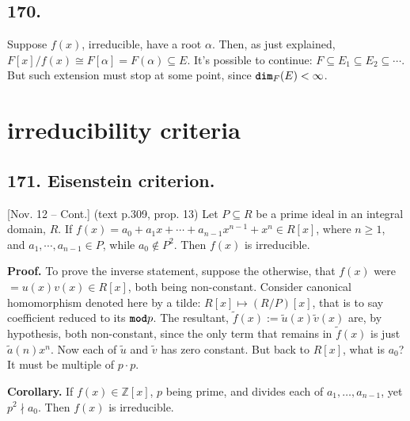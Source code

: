 \documentclass[12pt]{article}
\newcommand\aG\alpha \newcommand\bG\beta  \newcommand\gG\gamma \newcommand\dG\delta \newcommand\eG\varepsilon \newcommand\zG\zeta \newcommand\tG\vartheta \newcommand\kG\kappa \newcommand\lG\lambda \newcommand\sG\sigma \newcommand\fG\varphi \newcommand\oG\omega
\newcommand\oo\infty%
\newcommand\M\cdot%
\newcommand\Mp\mapsto%
\newcommand{\BF}[1]{ \mathbb{#1} }%
\newcommand{\Ss}[1]{\textsf{\bfseries{#1}}}%
\newcommand{\Tw}[1]{\texttt{\bfseries{#1}}}%
\begin{document}
\subsection*{170.} Suppose \(f(x)\), irreducible, have a root \(\aG\). 
Then, as just explained, \(F[x]/f(x) \cong F[\aG] = F(\aG) \subseteq E\). 
It's possible to continue: \(F \subseteq E_1 \subseteq E_2 \subseteq \dotsb\). 
But such extension must stop at some point, since \(\Tw{dim}_{F}(E) <\oo\). 

\section{irreducibility criteria}
\subsection*{171. Eisenstein criterion.} [Nov. 12 -- Cont.] (text p.309, prop. 13) Let \(P \subseteq R\) be a prime ideal in an integral domain, \(R\). 
If \(f(x) = a_0 +a_1x +\dotsb+ a_{n-1}x^{n-1} + x^n \in R[x]\), where \(n \geq 1\), and \(a_1,\dotsb,a_{n-1} \in P\), while \(a_0 \notin P^2\). 
Then \(f(x)\) is irreducible. \par
\Ss{Proof.} To prove the inverse statement, suppose the otherwise, that \(f(x)\) were \(= u(x) v(x) \in R[x]\), both being non-constant. 
Consider canonical homomorphism denoted here by a tilde: \(R[x] \Mp (R/P)[x]\), that is to say coefficient reduced to its \(\Tw{mod} p\). 
The resultant, \(\tilde{f}(x) := \tilde{u}(x) \tilde{v}(x)\) are, by hypothesis, both non-constant, since the only term that remains in \(\tilde{f}(x)\) is just \(\tilde{a}(n) x^n\). 
Now each of \(\tilde{u}\) and \(\tilde{v}\) has zero constant. 
But back to \(R[x]\), what is \(a_0\)? It must be multiple of \(p \M p\). \par
\Ss{Corollary.} If \(f(x) \in \BF{Z}[x]\), \(p\) being prime, and divides each of \(a_1,\dotsc,a_{n-1}\), yet \(p^2 \nmid a_0\). 
Then \(f(x)\) is irreducible. \par
\end{document}
